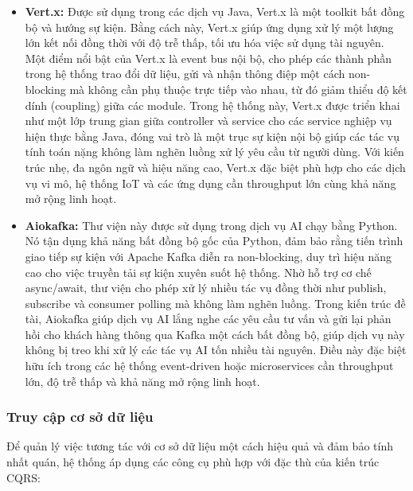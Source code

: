 \begin{itemize}
    \item \textbf{Vert.x: } Được sử dụng trong các dịch vụ Java, Vert.x là một toolkit bất đồng bộ và hướng sự kiện. Bằng cách này, Vert.x giúp ứng dụng xử lý một lượng lớn kết nối đồng thời với độ trễ thấp, tối ưu hóa việc sử dụng tài nguyên. Một điểm nổi bật của Vert.x là event bus nội bộ, cho phép các thành phần trong hệ thống trao đổi dữ liệu, gửi và nhận thông điệp một cách non-blocking mà không cần phụ thuộc trực tiếp vào nhau\cite{vertx_core}, từ đó giảm thiểu độ kết dính (coupling) giữa các module. Trong hệ thống này, Vert.x được triển khai như một lớp trung gian giữa controller và service cho các service nghiệp vụ hiện thực bằng Java, đóng vai trò là một trục sự kiện nội bộ giúp các tác vụ tính toán nặng không làm nghẽn luồng xử lý yêu cầu từ người dùng. Với kiến trúc nhẹ, đa ngôn ngữ và hiệu năng cao, Vert.x đặc biệt phù hợp cho các dịch vụ vi mô, hệ thống IoT và các ứng dụng cần throughput lớn cùng khả năng mở rộng linh hoạt.

    \item \textbf{Aiokafka: } Thư viện này được sử dụng trong dịch vụ AI chạy bằng Python. Nó tận dụng khả năng bất đồng bộ gốc của Python, đảm bảo rằng tiến trình giao tiếp sự kiện với Apache Kafka diễn ra non-blocking, duy trì hiệu năng cao cho việc truyền tải sự kiện xuyên suốt hệ thống\cite{aiokafka_perf}. Nhờ hỗ trợ cơ chế async/await, thư viện cho phép xử lý nhiều tác vụ đồng thời như publish, subscribe và consumer polling mà không làm nghẽn luồng\cite{aiokafka_perf}. Trong kiến trúc đề tài, Aiokafka giúp dịch vụ AI lắng nghe các yêu cầu tư vấn và gửi lại phản hồi cho khách hàng thông qua Kafka một cách bất đồng bộ, giúp dịch vụ này không bị treo khi xử lý các tác vụ AI tốn nhiều tài nguyên. Điều này đặc biệt hữu ích trong các hệ thống event-driven hoặc microservices cần throughput lớn, độ trễ thấp và khả năng mở rộng linh hoạt.
\end{itemize}

\subsubsection{Truy cập cơ sở dữ liệu}

Để quản lý việc tương tác với cơ sở dữ liệu một cách hiệu quả và đảm bảo tính nhất quán, hệ thống áp dụng các công cụ phù hợp với đặc thù của kiến trúc CQRS:

